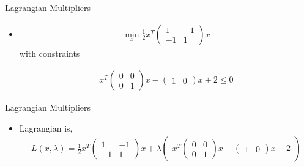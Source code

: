 \documentclass{beamer}
\begin{document}
\begin{frame}{Lagrangian Multipliers}
  \begin{itemize}
  \item {
 \begin{align}
\min_x
  \frac{1}{2}x^T\begin{pmatrix}
		1 & -1\\
		-1 & 1
		\end{pmatrix}x
 \end{align}
 with constraints

  \begin{align}	
  x^{T}\begin{pmatrix}
		0 & 0\\
		0 & 1
		\end{pmatrix}x-\begin{pmatrix}
		1 & 0
		\end{pmatrix}x+2 \leq 0
 \end{align}
  }
 \end{itemize}

\end{frame}


\begin{frame}{Lagrangian Multipliers}
  \begin{itemize}
  \item {
  Lagrangian is,
 \begin{align}
 L(x,\lambda)= 
  \frac{1}{2}x^T\begin{pmatrix}
		1 & -1\\
		-1 & 1
		\end{pmatrix}x + \lambda
  \begin{pmatrix}
  x^{T}\begin{pmatrix}
		0 & 0\\
		0 & 1
		\end{pmatrix}x-\begin{pmatrix}
		1 & 0
		\end{pmatrix}x+2 
	\end{pmatrix}
 \end{align}

  }
 \end{itemize}

\end{frame}
\end{document}
